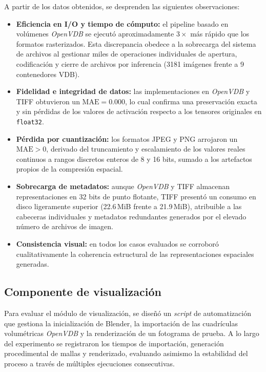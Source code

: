 A partir de los datos obtenidos, se desprenden las siguientes observaciones:
\begin{itemize}
    \item \textbf{Eficiencia en I/O y tiempo de cómputo:} el pipeline basado en volúmenes \textit{OpenVDB} 
    se ejecutó aproximadamente $3\times$ más rápido que los formatos rasterizados. Esta discrepancia obedece a 
    la sobrecarga del sistema de archivos al gestionar miles de operaciones individuales de apertura, 
    codificación y cierre de archivos por inferencia (3181 imágenes frente a 9 contenedores VDB).
    \item \textbf{Fidelidad e integridad de datos:} las implementaciones en \textit{OpenVDB} y TIFF obtuvieron un 
    $\text{MAE} = 0.000$, lo cual confirma una preservación exacta y sin pérdidas de los valores de activación 
    respecto a los tensores originales en \texttt{float32}.
    \item \textbf{Pérdida por cuantización:} los formatos JPEG y PNG arrojaron un $\text{MAE} > 0$, 
    derivado del truncamiento y escalamiento de los valores reales continuos a rangos discretos enteros de 8 y 16 
    bits, sumado a los artefactos propios de la compresión espacial.
    \item \textbf{Sobrecarga de metadatos:} aunque \textit{OpenVDB} y TIFF almacenan representaciones en 32 
    bits de punto flotante, TIFF presentó un consumo en disco ligeramente superior (22.6\,MiB frente a 21.9\,MiB), 
    atribuible a las cabeceras individuales y metadatos redundantes generados por el elevado número de archivos de 
    imagen.
    \item \textbf{Consistencia visual:} en todos los casos evaluados se corroboró cualitativamente la coherencia 
    estructural de las representaciones espaciales generadas.
\end{itemize}

\subsection{Componente de visualización}
Para evaluar el módulo de visualización, se diseñó un \textit{script} de automatización que gestiona la inicialización de Blender, 
la importación de las cuadrículas volumétricas \textit{OpenVDB} y la renderización de un fotograma de prueba. A lo largo del experimento 
se registraron los tiempos de importación, generación procedimental de mallas y renderizado, evaluando asimismo la estabilidad del proceso 
a través de múltiples ejecuciones consecutivas.
\medskip


